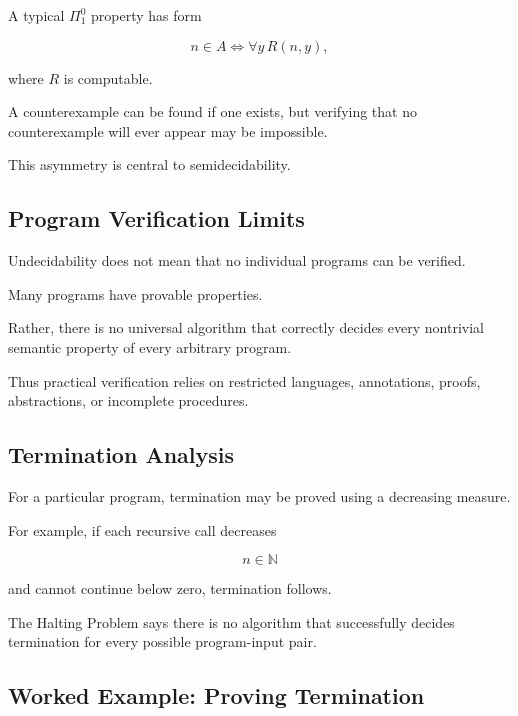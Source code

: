A typical \(\Pi^0_1\) property has form

\[
\boxed{
n\in A
\iff
\forall y\,R(n,y),
}
\]

where \(R\) is computable.

A counterexample can be found if one exists, but verifying that no
counterexample will ever appear may be impossible.

This asymmetry is central to semidecidability.

\subsection{Program Verification Limits}
\label{subsec:program-verification-limits}

Undecidability does not mean that no individual programs can be verified.

Many programs have provable properties.

Rather, there is no universal algorithm that correctly decides every
nontrivial semantic property of every arbitrary program.

Thus practical verification relies on restricted languages, annotations,
proofs, abstractions, or incomplete procedures.

\subsection{Termination Analysis}
\label{subsec:termination-analysis}

For a particular program, termination may be proved using a decreasing
measure.

For example, if each recursive call decreases

\[
n\in\mathbb{N}
\]

and cannot continue below zero, termination follows.

The Halting Problem says there is no algorithm that successfully decides
termination for every possible program-input pair.

\subsection{Worked Example: Proving Termination}
\label{subsec:worked-termination-measure}

